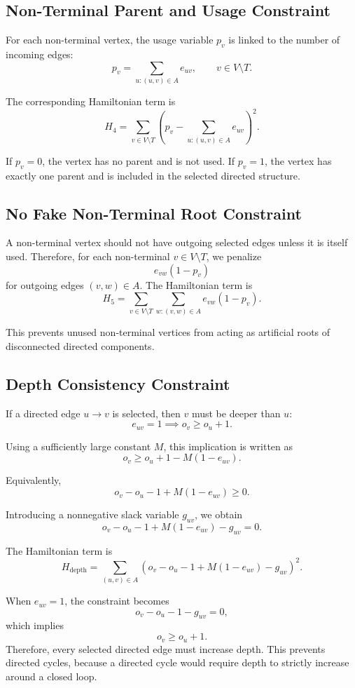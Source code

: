 \documentclass[a4paper,12pt]{report}
\begin{document}
\subsection{Non-Terminal Parent and Usage Constraint}

For each non-terminal vertex, the usage variable \(p_v\) is linked to the number of incoming edges:
\[
p_v
=
\sum_{u:(u,v)\in A}e_{uv},
\qquad
v\in V\setminus T.
\]

The corresponding Hamiltonian term is
\[
H_4
=
\sum_{v\in V\setminus T}
\left(
p_v-\sum_{u:(u,v)\in A}e_{uv}
\right)^2.
\]

If \(p_v=0\), the vertex has no parent and is not used. If \(p_v=1\), the vertex has exactly one parent and is included in the selected directed structure.

\subsection{No Fake Non-Terminal Root Constraint}

A non-terminal vertex should not have outgoing selected edges unless it is itself used. Therefore, for each non-terminal \(v\in V\setminus T\), we penalize
\[
e_{vw}(1-p_v)
\]
for outgoing edges \((v,w)\in A\). The Hamiltonian term is
\[
H_5
=
\sum_{v\in V\setminus T}
\sum_{w:(v,w)\in A}
e_{vw}(1-p_v).
\]

This prevents unused non-terminal vertices from acting as artificial roots of disconnected directed components.

\subsection{Depth Consistency Constraint}

If a directed edge \(u\to v\) is selected, then \(v\) must be deeper than \(u\):
\[
e_{uv}=1
\implies
o_v\ge o_u+1.
\]

Using a sufficiently large constant \(M\), this implication is written as
\[
o_v
\ge
o_u+1-M(1-e_{uv}).
\]

Equivalently,
\[
o_v-o_u-1+M(1-e_{uv})\ge 0.
\]

Introducing a nonnegative slack variable \(g_{uv}\), we obtain
\[
o_v-o_u-1+M(1-e_{uv})-g_{uv}=0.
\]

The Hamiltonian term is
\[
H_{\text{depth}}
=
\sum_{(u,v)\in A}
\left(
o_v-o_u-1+M(1-e_{uv})-g_{uv}
\right)^2.
\]

When \(e_{uv}=1\), the constraint becomes
\[
o_v-o_u-1-g_{uv}=0,
\]
which implies
\[
o_v\ge o_u+1.
\]
Therefore, every selected directed edge must increase depth. This prevents directed cycles, because a directed cycle would require depth to strictly increase around a closed loop.
\end{document}
